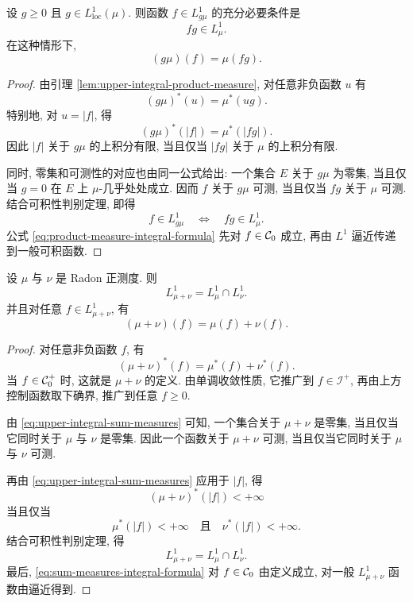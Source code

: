 \begin{thm}\label{thm:l1-product-measure-characterization}
	设 \(g\geq0\) 且 \(g\in L^1_{\operatorname{loc}}(\mu)\). 则函数 \(f\in L^1_{g\mu}\) 的充分必要条件是
	\[
	fg\in L^1_\mu.
	\]
	在这种情形下,
	\begin{equation}
		(g\mu)(f)=\mu(fg).
		\label{eq:product-measure-integral-formula}
	\end{equation}
\end{thm}

\begin{proof}
	由引理 \ref{lem:upper-integral-product-measure}, 对任意非负函数 \(u\) 有
	\[
	(g\mu)^*(u)=\mu^*(ug).
	\]
	特别地, 对 \(u=|f|\), 得
	\[
	(g\mu)^*(|f|)=\mu^*(|fg|).
	\]
	因此 \(|f|\) 关于 \(g\mu\) 的上积分有限, 当且仅当 \(|fg|\) 关于 \(\mu\) 的上积分有限.
	
	同时, 零集和可测性的对应也由同一公式给出: 一个集合 \(E\) 关于 \(g\mu\) 为零集, 当且仅当 \(g=0\) 在 \(E\) 上 \(\mu\)-几乎处处成立. 因而 \(f\) 关于 \(g\mu\) 可测, 当且仅当 \(fg\) 关于 \(\mu\) 可测. 结合可积性判别定理, 即得
	\[
	f\in L^1_{g\mu}\quad\Longleftrightarrow\quad fg\in L^1_\mu.
	\]
	公式 \eqref{eq:product-measure-integral-formula} 先对 \(f\in\mathcal{C}_0\) 成立, 再由 \(L^1\) 逼近传递到一般可积函数.
\end{proof}

\begin{thm}\label{thm:l1-intersection-sum-measures}
	设 \(\mu\) 与 \(\nu\) 是 Radon 正测度. 则
	\[
	L^1_{\mu+\nu}=L^1_\mu\cap L^1_\nu.
	\]
	并且对任意 \(f\in L^1_{\mu+\nu}\), 有
	\begin{equation}
		(\mu+\nu)(f)=\mu(f)+\nu(f).
		\label{eq:sum-measures-integral-formula}
	\end{equation}
\end{thm}

\begin{proof}
	对任意非负函数 \(f\), 有
	\begin{equation}
		(\mu+\nu)^*(f)=\mu^*(f)+\nu^*(f).
		\label{eq:upper-integral-sum-measures}
	\end{equation}
	当 \(f\in\mathcal{C}_0^+\) 时, 这就是 \(\mu+\nu\) 的定义. 由单调收敛性质, 它推广到 \(f\in\mathcal I^+\), 再由上方控制函数取下确界, 推广到任意 \(f\geq0\).
	
	由 \eqref{eq:upper-integral-sum-measures} 可知, 一个集合关于 \(\mu+\nu\) 是零集, 当且仅当它同时关于 \(\mu\) 与 \(\nu\) 是零集. 因此一个函数关于 \(\mu+\nu\) 可测, 当且仅当它同时关于 \(\mu\) 与 \(\nu\) 可测.
	
	再由 \eqref{eq:upper-integral-sum-measures} 应用于 \(|f|\), 得
	\[
	(\mu+\nu)^*(|f|)<+\infty
	\]
	当且仅当
	\[
	\mu^*(|f|)<+\infty
	\quad\text{且}\quad
	\nu^*(|f|)<+\infty.
	\]
	结合可积性判别定理, 得
	\[
	L^1_{\mu+\nu}=L^1_\mu\cap L^1_\nu.
	\]
	最后, \eqref{eq:sum-measures-integral-formula} 对 \(f\in\mathcal{C}_0\) 由定义成立, 对一般 \(L^1_{\mu+\nu}\) 函数由逼近得到.
\end{proof}

